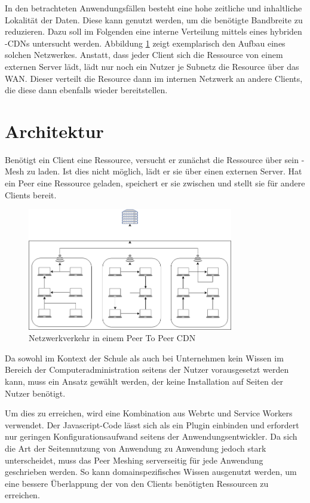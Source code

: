 In den betrachteten Anwendungsfällen besteht eine hohe zeitliche und inhaltliche Lokalität der Daten. Diese kann genutzt werden, um die benötigte Bandbreite zu reduzieren. Dazu soll im Folgenden eine interne Verteilung mittels eines hybriden \pTp-CDNs untersucht werden. Abbildung \ref{fig:mesh} zeigt exemplarisch den Aufbau eines solchen Netzwerkes. Anstatt, dass jeder Client sich die Ressource von einem externen Server lädt, lädt nur noch ein Nutzer je Subnetz die Resource über das WAN. Dieser verteilt die Resource dann im internen Netzwerk an andere Clients, die diese dann ebenfalls wieder bereitstellen.

\section{Architektur}\label{k:architektur}

Benötigt ein Client eine Ressource, versucht er zunächst die Ressource über sein \pTp-Mesh zu laden. Ist dies nicht möglich, lädt er sie über einen externen Server. Hat ein Peer eine Ressource geladen, speichert er sie zwischen und stellt sie für andere Clients bereit.

\begin{figure}[!h]
	\centering
	\includegraphics[width=0.8\textwidth]{figures/network_p2p}
	\caption[A Figure Short-Title]{Netzwerkverkehr in einem Peer To Peer CDN}
	\label{fig:mesh}
\end{figure}

Da sowohl im Kontext der Schule als auch bei Unternehmen kein Wissen im Bereich der Computeradministration seitens der Nutzer vorausgesetzt werden kann, muss ein Ansatz gewählt werden, der keine Installation auf Seiten der Nutzer benötigt.

Um dies zu erreichen, wird eine Kombination aus Webrtc und Service Workers verwendet. Der Javascript-Code lässt sich als ein Plugin einbinden und erfordert nur geringen Konfigurationsaufwand seitens der Anwendungsentwickler. Da sich die Art der Seitennutzung von Anwendung zu Anwendung jedoch stark unterscheidet, muss das Peer Meshing serverseitig für jede Anwendung geschrieben werden. So kann domainspezifisches Wissen ausgenutzt werden, um eine bessere Überlappung der von den Clients benötigten Ressourcen zu erreichen.

